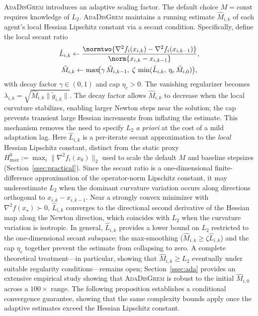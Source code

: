 \documentclass[review,onefignum,onetabnum]{siamart171218}
\begin{document}
	\textsc{AdaDisGrem} introduces an adaptive scaling factor.
	The default choice $M=\mathrm{const}$ requires knowledge of $L_2$.
	\textsc{AdaDisGrem} maintains a running estimate $\hat M_{i,k}$ of
	each agent's local Hessian Lipschitz constant via a secant condition.
	Specifically, define the local secant ratio
	\begin{gather*}
	\hat L_{i,k}\gets
	\frac{\normtwo{\nabla^2 f_i(x_{i,k})-\nabla^2 f_i(x_{i,k-1})}}
	     {\norm{x_{i,k}-x_{i,k-1}}},\\
	\hat M_{i,k}\gets \max\!\bigl(\gamma\,\hat M_{i,k-1},\;
	\zeta\,\min(\hat L_{i,k},\,\eta_c\,\hat M_{i,0})\bigr),
	\end{gather*}
	with decay factor $\gamma\in(0,1)$ and cap $\eta_c>0$.
	The vanishing regularizer becomes $\lambda_{i,k}=\sqrt{\hat M_{i,k}\|\tilde g_{i,k}\|}$.
	The decay factor allows $\hat M_{i,k}$ to decrease when the local
	curvature stabilizes, enabling larger Newton steps near the solution;
	the cap prevents transient large Hessian increments from inflating
	the estimate.
	This mechanism removes the need to specify $L_2$ \emph{a priori}
	at the cost of a mild adaptation lag.
	Here $\hat L_{i,k}$ is a per-iterate secant
	approximation to the \emph{local} Hessian Lipschitz constant,
	distinct from the static proxy
	$H_{\max}^0 := \max_i\|\nabla^2 f_i(x_0)\|_2$ used to
	scale the default $M$ and baseline stepsizes (Section~\ref{ssec:practical}).
	Since the secant ratio is a one-dimensional finite-difference
	approximation of the operator-norm Lipschitz constant, it may
	underestimate $L_2$ when the dominant curvature variation occurs
	along directions orthogonal to $x_{i,k}-x_{i,k-1}$.
	Near a strongly convex minimizer with $\nabla^2 f(x_\star)\succ 0$,
	$\hat L_{i,k}$ converges to the directional second
	derivative of the Hessian map along the Newton direction, which
	coincides with $L_2$ when the curvature variation is isotropic.
	In general, $\hat L_{i,k}$ provides a lower bound on $L_2$
	restricted to the one-dimensional secant subspace; the
	max-smoothing ($\hat M_{i,k}\ge\zeta\hat L_{i,k}$) and the cap
	$\eta_c$ together prevent the estimate from collapsing to zero.
	A complete theoretical treatment---in particular, showing that
	$\hat M_{i,k}\ge L_2$ eventually under suitable regularity
	conditions---remains open;
	Section~\ref{ssec:ada} provides an extensive empirical study
	showing that \textsc{AdaDisGrem} is robust to the initial
	$\hat M_{i,0}$ across a $100\times$ range.
	The following proposition establishes a conditional convergence
	guarantee, showing that the same complexity bounds apply once
	the adaptive estimates exceed the Hessian Lipschitz constant.
\end{document}
